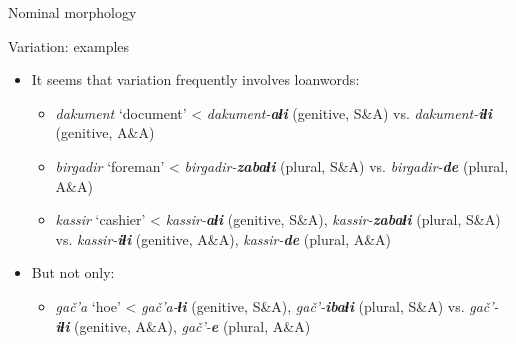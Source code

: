 \begin{frame}{Nominal morphology}
\begin{center}Variation: examples
\end{center}
\begin{itemize}
    \item It seems that variation frequently involves loanwords: 
    \begin{itemize}
        \item \textit{dakument} `document' < \textit{dakument-\textbf{aɬi}} (genitive, S\&A) vs. \textit{dakument-\textbf{iɬi}} (genitive, A\&A)
        \item \textit{birgadir} `foreman' < \textit{birgadir-\textbf{zabaɬi}} (plural, S\&A) vs. \textit{birgadir-\textbf{de}} (plural, A\&A)
        \item \textit{kassir} `cashier' < \textit{kassir-\textbf{aɬi}} (genitive, S\&A), \textit{kassir-\textbf{zabaɬi}} (plural, S\&A) vs. \textit{kassir-\textbf{iɬi}} (genitive, A\&A), \textit{kassir-\textbf{de}} (plural, A\&A)
    \end{itemize}
    \pause
    \item But not only:
    \begin{itemize}
        \item \textit{gač'a} `hoe' < \textit{gač'a-\textbf{ɬi}} (genitive, S\&A), \textit{gač'-\textbf{ibaɬi}} (plural, S\&A) vs. \textit{gač'-\textbf{iɬi}} (genitive, A\&A), \textit{gač'-\textbf{e}} (plural, A\&A)
    \end{itemize}
\end{itemize}
\end{frame}

